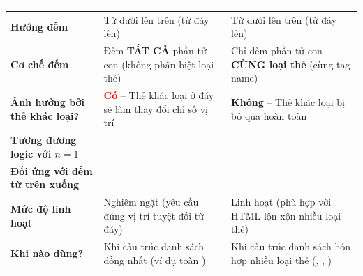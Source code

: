 \begin{prettyTableBox}
\sffamily\small
\begin{tabularx}{\linewidth}{|>{\raggedright\arraybackslash\bfseries\color{primaryBlue}}m{3.2cm}|Z|Z|}
\hline
{}  &  &  \\
\hline
Hướng đếm & Từ dưới lên trên (từ đáy lên) & Từ dưới lên trên (từ đáy lên) \\
\hline
Cơ chế đếm & Đếm \textbf{TẤT CẢ} phần tử con (không phân biệt loại thẻ) & Chỉ đếm phần tử con \textbf{CÙNG loại thẻ} (cùng tag name) \\
\hline
Ảnh hưởng bởi thẻ khác loại? & \textcolor{red}{\textbf{Có}} -- Thẻ khác loại ở đáy sẽ làm thay đổi chỉ số vị trí & \textcolor{green!70!black}{\textbf{Không}} -- Thẻ khác loại bị bỏ qua hoàn toàn \\
\hline
Tương đương logic với $n=1$ &  &  \\
\hline
Đối ứng với đếm từ trên xuống &  &  \\
\hline
Mức độ linh hoạt & Nghiêm ngặt (yêu cầu đúng vị trí tuyệt đối từ đáy) & Linh hoạt (phù hợp với HTML lộn xộn nhiều loại thẻ) \\
\hline
Khi nào dùng? & Khi cấu trúc danh sách đồng nhất (ví dụ toàn ) & Khi cấu trúc danh sách hỗn hợp nhiều loại thẻ (, , ) \\
\hline
\end{tabularx}
\end{prettyTableBox}

